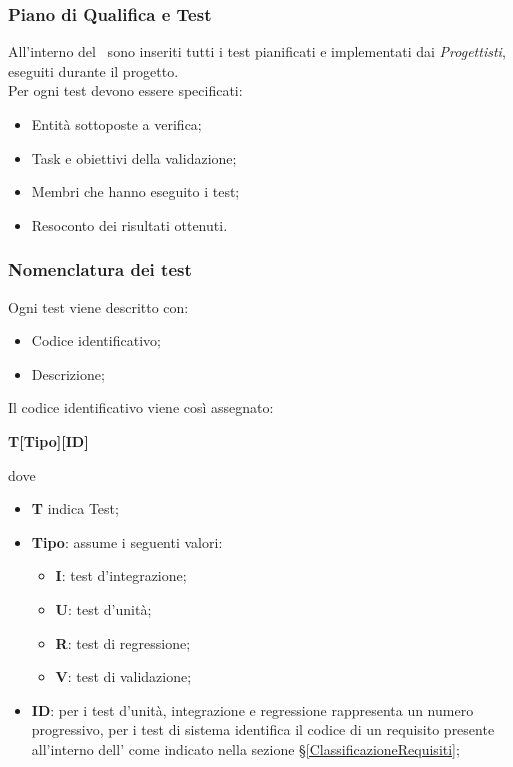 \subsubsection{Piano di Qualifica e Test}
All'interno del \PdQv{}\ sono inseriti tutti i test pianificati e implementati dai \textit{Progettisti}, eseguiti durante il progetto.\\
Per ogni test devono essere specificati:
\begin{itemize}
	\item Entità sottoposte a verifica;
	\item Task e obiettivi della validazione;
	\item Membri che hanno eseguito i test;
	\item Resoconto dei risultati ottenuti.
\end{itemize}

\subsubsection{Nomenclatura dei test}
Ogni test viene descritto con:
\begin{itemize}
	\item Codice identificativo;
	\item Descrizione;
\end{itemize}
Il codice identificativo viene così assegnato:
\begin{center}
	\textbf{T[Tipo][ID]}
\end{center}
dove
\begin{itemize}
	\item \textbf{T} indica Test;
	\item\textbf{Tipo}: assume i seguenti valori:
	\begin{itemize}
		\item \textbf{I}: test d'integrazione;
		\item \textbf{U}: test d'unità;
		\item \textbf{R}: test di regressione;
		\item \textbf{V}: test di validazione;
	\end{itemize}
	\item \textbf{ID}: per i test d'unità, integrazione e regressione rappresenta un numero progressivo, per i test di sistema identifica il codice di un requisito presente all'interno dell'\AdRv{} come indicato nella sezione \S\ref{ClassificazioneRequisiti};
\end{itemize}
	